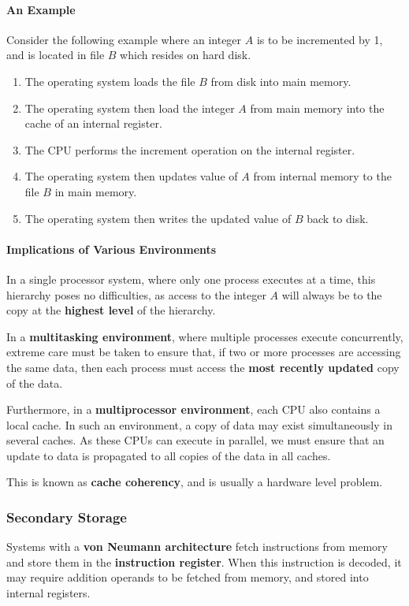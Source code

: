 \documentclass{article}
\begin{document}
\paragraph{An Example}
Consider the following example where an integer \(A\) is to be
incremented by 1, and is located in file \(B\) which resides on hard
disk.
\begin{enumerate}
    \item The operating system loads the file \(B\) from disk into main
          memory.
    \item The operating system then load the integer \(A\) from main
          memory into the cache of an internal register.
    \item The CPU performs the increment operation on the internal
          register.
    \item The operating system then updates value of \(A\) from
          internal memory to the file \(B\) in main memory.
    \item The operating system then writes the updated value of \(B\)
          back to disk.
\end{enumerate}
\paragraph{Implications of Various Environments}
In a single processor system, where only one process executes at a
time, this hierarchy poses no difficulties, as access to the integer
\(A\) will always be to the copy at the \textbf{highest level} of the
hierarchy.

In a \textbf{multitasking environment}, where multiple processes
execute concurrently, extreme care must be taken to ensure that, if two
or more processes are accessing the same data, then each process must
access the \textbf{most recently updated} copy of the data.

Furthermore, in a \textbf{multiprocessor environment}, each CPU also
contains a local cache. In such an environment, a copy of data may
exist simultaneously in several caches. As these CPUs can execute in
parallel, we must ensure that an update to data is propagated to all
copies of the data in all caches.

This is known as \textbf{cache coherency}, and is usually a hardware
level problem.
\subsubsection{Secondary Storage}
Systems with a \textbf{von Neumann architecture} fetch instructions
from memory and store them in the \textbf{instruction register}. When
this instruction is decoded, it may require addition operands to be
fetched from memory, and stored into internal registers.
\end{document}
